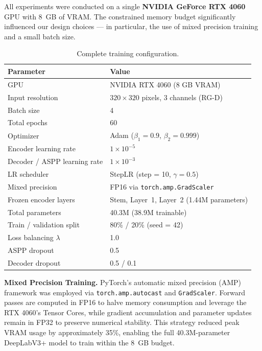 \documentclass[12pt, a4paper]{article}
\begin{document}
All experiments were conducted on a single \textbf{NVIDIA GeForce RTX 4060} GPU with 8~GB of VRAM. The constrained memory budget significantly influenced our design choices — in particular, the use of mixed precision training and a small batch size.

\begin{table}[H]
\centering
\caption{Complete training configuration.}
\label{tab:config}
\begin{tabular}{@{}ll@{}}
\toprule
\textbf{Parameter} & \textbf{Value} \\
\midrule
GPU                          & NVIDIA RTX 4060 (8 GB VRAM) \\
Input resolution             & $320 \times 320$ pixels, 3 channels (RG-D) \\
Batch size                   & 4 \\
Total epochs                 & 60 \\
Optimizer                    & Adam ($\beta_1 = 0.9$, $\beta_2 = 0.999$) \\
Encoder learning rate        & $1 \times 10^{-5}$ \\
Decoder / ASPP learning rate & $1 \times 10^{-3}$ \\
LR scheduler                 & StepLR (step = 10, $\gamma = 0.5$) \\
Mixed precision              & FP16 via \texttt{torch.amp.GradScaler} \\
Frozen encoder layers        & Stem, Layer~1, Layer~2 (1.44M parameters) \\
Total parameters             & 40.3M (38.9M trainable) \\
Train / validation split     & 80\% / 20\% (seed = 42) \\
Loss balancing $\lambda$     & 1.0 \\
ASPP dropout                 & 0.5 \\
Decoder dropout              & 0.5 / 0.1 \\
\bottomrule
\end{tabular}
\end{table}

\textbf{Mixed Precision Training.}
PyTorch's automatic mixed precision (AMP) framework was employed via \texttt{torch.amp.autocast} and \texttt{GradScaler}. Forward passes are computed in FP16 to halve memory consumption and leverage the RTX 4060's Tensor Cores, while gradient accumulation and parameter updates remain in FP32 to preserve numerical stability. This strategy reduced peak VRAM usage by approximately 35\%, enabling the full 40.3M-parameter DeepLabV3+ model to train within the 8~GB budget.
\end{document}
